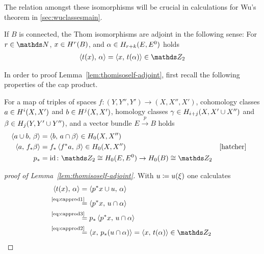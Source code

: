 The relation amongst these isomorphisms will be crucial in
calculations for Wu's theorem in \autoref{sec:wuclassesmain}.
\begin{Lem}\label{lem:thomisoself-adjoint}
  If $B$ is connected, the Thom isomorphisms are adjoint in the
  following sense:
  For $r\in\Nat$, $x\in H^r(B)$,
  and $\alpha\in H_{r+k}(E, {E}^0)$  holds 
  \begin{gather*}
    \capped{t(x)}{\alpha} = \capped{x}{t(\alpha)} \in\Zmod2
  \end{gather*}
\end{Lem}
In order to proof Lemma~\autoref{lem:thomisoself-adjoint},
first recall the following properties of the cap product.
\begin{Rem}
  For
  a map of triples of spaces
  $f\colon (Y,Y'',Y')\to (X,X'',X')$,
  cohomology classes
  $a\in H^i(X,X')$ and $b\in H^j(X,X')$,
  homology classes
  $\gamma\in H_{i+j}(X, X'\cup X'')$
  and
  $\beta\in H_j(Y, Y'\cup Y'')$,
  and a vector bundle $E\xrightarrow{p}B$
  holds
  \begin{align}
    \label{eq:capprod1}
    \capped{a\cup b}{\beta} &= \capped{b}{a\cap\beta}
                              \in \H_0(X,X'')\\
    \label{eq:capprod2}
    \capped{a}{\pf f \beta} &= \pf f \capped{\pb f a}{\beta}
                              \in \H_0(X,X'')
                            &&\text{\cite[Chap.~3.3.2, p.\,241]{hatcher}}\\
    \label{eq:capprod3}
    \pf p &= \Id \colon
    \Zmod2\cong \H_0(\thomspacepair{E})\to \H_0(B)\cong\Zmod2
  \end{align}
\end{Rem}
\begin{proof}[proof of Lemma~\autoref{lem:thomisoself-adjoint}]
  With $u\coloneqq{u}(\xi)$ one calculates
  \begin{align*}
    \capped{t(x)}{\alpha}
    &= \capped{\pb p x \cup \U}{\alpha} \\
    &\equalsby{\eqref{eq:capprod1}}
      \capped{\pb p x}{\U\cap\alpha} \\
    &\equalsby{\eqref{eq:capprod3}}
      \pf p\capped{\pb p x}{\U\cap\alpha} \\
    &\equalsby{\eqref{eq:capprod2}}
      \capped{x}{\pf p(u\cap\alpha)}
      = \capped{x}{\thomiso (\alpha)} \in\Zmod2
      \qedhere
  \end{align*}
\end{proof}

